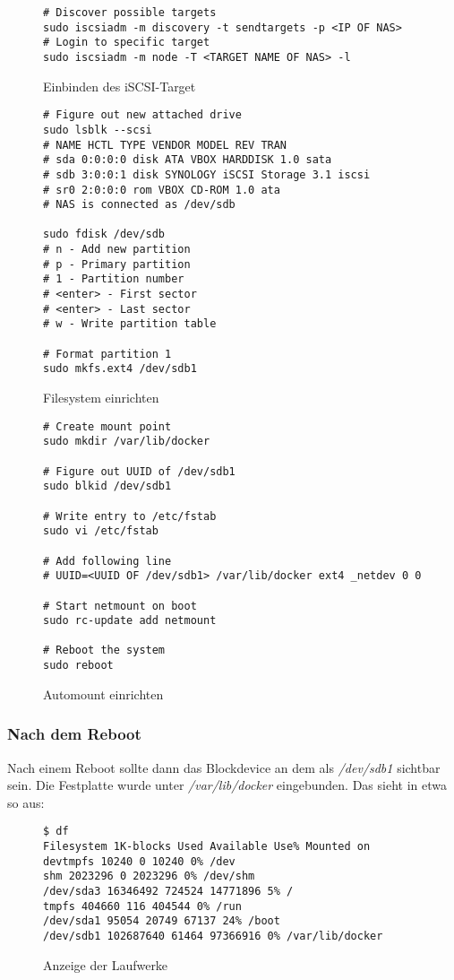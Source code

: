 \documentclass[12pt,a4paper,ngerman]{article}
\newcommand{\code}[1]{\textit{#1}}
\newcommand{\jpacaption}[1]{\caption{#1}\label{fig:#1}}
\begin{document}
\begin{figure}[H]
    \begin{lstlisting}
# Discover possible targets
sudo iscsiadm -m discovery -t sendtargets -p <IP OF NAS>
# Login to specific target
sudo iscsiadm -m node -T <TARGET NAME OF NAS> -l
    \end{lstlisting}
    \jpacaption{Einbinden des iSCSI-Target}
\end{figure}

\begin{figure}[H]
    \begin{lstlisting}
# Figure out new attached drive
sudo lsblk --scsi
# NAME HCTL TYPE VENDOR MODEL REV TRAN
# sda 0:0:0:0 disk ATA VBOX HARDDISK 1.0 sata
# sdb 3:0:0:1 disk SYNOLOGY iSCSI Storage 3.1 iscsi
# sr0 2:0:0:0 rom VBOX CD-ROM 1.0 ata
# NAS is connected as /dev/sdb

sudo fdisk /dev/sdb
# n - Add new partition
# p - Primary partition
# 1 - Partition number
# <enter> - First sector
# <enter> - Last sector
# w - Write partition table

# Format partition 1
sudo mkfs.ext4 /dev/sdb1
    \end{lstlisting}
    \jpacaption{Filesystem einrichten}
\end{figure}

\begin{figure}[H]
    \begin{lstlisting}
# Create mount point
sudo mkdir /var/lib/docker

# Figure out UUID of /dev/sdb1
sudo blkid /dev/sdb1

# Write entry to /etc/fstab
sudo vi /etc/fstab

# Add following line
# UUID=<UUID OF /dev/sdb1> /var/lib/docker ext4 _netdev 0 0

# Start netmount on boot
sudo rc-update add netmount

# Reboot the system
sudo reboot
    \end{lstlisting}
    \jpacaption{Automount einrichten}
\end{figure}

\subsubsection{Nach dem Reboot}
Nach einem Reboot sollte dann das Blockdevice an dem als \code{/dev/sdb1}
sichtbar sein. Die Festplatte wurde unter \code{/var/lib/docker} eingebunden.
Das sieht in etwa so aus:

\begin{figure}[H]
    \begin{lstlisting}
$ df
Filesystem 1K-blocks Used Available Use% Mounted on
devtmpfs 10240 0 10240 0% /dev
shm 2023296 0 2023296 0% /dev/shm
/dev/sda3 16346492 724524 14771896 5% /
tmpfs 404660 116 404544 0% /run
/dev/sda1 95054 20749 67137 24% /boot
/dev/sdb1 102687640 61464 97366916 0% /var/lib/docker
    \end{lstlisting}
    \jpacaption{Anzeige der Laufwerke}
\end{figure}
\end{document}
